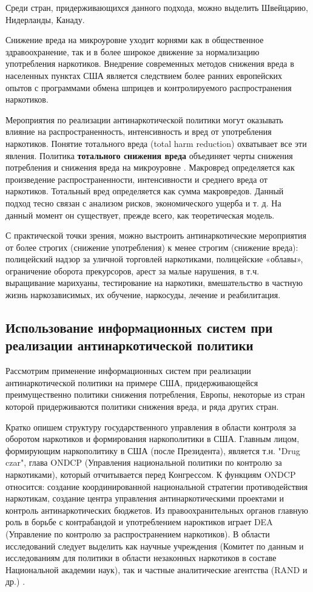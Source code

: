 Среди стран, придерживающихся данного подхода, можно выделить Швейцарию, 
Нидерланды, Канаду.
 
Снижение вреда на микроуровне уходит корнями как в общественное здравоохранение, 
так и в более широкое движение за нормализацию употребления наркотиков. 
Внедрение современных методов снижения вреда в населенных пунктах США является 
следствием более ранних европейских опытов с программами обмена шприцев и 
контролируемого распространения наркотиков. 

Мероприятия по реализации антинаркотической политики могут оказывать влияние на 
распространенность, интенсивность и вред от употребления наркотиков. Понятие 
тотального вреда (total harm reduction) охватывает все эти явления. Политика 
\textbf{тотального снижения вреда} объединяет черты снижения потребления и 
снижения вреда на микроуровне \cite{MacCoun2001}. Макровред определяется как 
произведение  распространенности, интенсивности и среднего вреда от наркотиков. 
Тотальный вред определяется как сумма макровредов. Данный подход тесно связан с 
анализом рисков, экономического ущерба и т. д. На данный момент он существует, 
прежде всего, как теоретическая модель. 

С практической точки зрения, можно выстроить антинаркотические мероприятия от 
более строгих (снижение употребления) к менее строгим (снижение вреда): 
полицейский надзор за уличной торговлей наркотиками, полицейские «облавы», 
ограничение оборота прекурсоров, арест за малые нарушения, в т.ч. выращивание 
марихуаны, тестирование на наркотики, вмешательство в частную жизнь 
наркозависимых, их обучение, наркосуды, лечение и реабилитация.

\subsection{Использование информационных систем при реализации антинаркотической 
    политики}

Рассмотрим применение информационных систем при реализации антинаркотической 
политики на примере США, придерживающейся преимущественно политики снижения 
потребления, Европы, некоторые из стран которой придерживаются политики
снижения вреда, и ряда других стран. 

Кратко опишем структуру государственного управления в области контроля за
оборотом наркотиков и формирования наркополитики в США. Главным лицом,
формирующим наркополитику в США (после Президента), является т.н. "Drug czar",
глава ONDCP (Управления национальной политики по контролю за наркотиками),
который отчитывается перед Конгрессом. К функциям ONDCP относится: создание
координированной национальной стратегии противодействия наркотикам, создание
центра управления антинаркотическими проектами и контроль антинаркотических
бюджетов.  Из правоохранительных органов главную роль в борьбе с контрабандой и
употреблением нароктиков играет DEA (Управление по контролю за распространением
наркотиков). В области исследований следует выделить как научные учреждения
(Комитет по данным и исследованиям для политики в области незаконных наркотиков
в составе Национальной академии наук), так и частные аналитические агентства
(RAND и др.) \cite{Robinson2007,InfAmerPolicy2001}.

